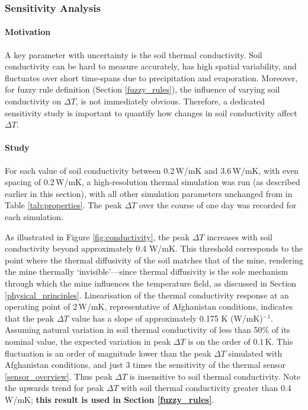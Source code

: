     \subsubsection{Sensitivity Analysis} \label{sec:cv_sensitivity}
    
        \paragraph{Motivation}
            
            \noindent A key parameter with uncertainty is the soil thermal conductivity. Soil conductivity can be hard to measure accurately, has high spatial variability, and fluctuates over short time-spans due to precipitation and evaporation. Moreover, for fuzzy rule definition (Section \ref{fuzzy_rules}), the influence of varying soil conductivity on \(\Delta T\), is not immediately obvious. Therefore, a dedicated sensitivity study is important to quantify how changes in soil conductivity affect \(\Delta T\).
        
        \paragraph{Study}
        
            \noindent For each value of soil conductivity between 0.2\,W/mK and 3.6\,W/mK, with even spacing of 0.2\,W/mK, a high-resolution thermal simulation was run (as described earlier in this section), with all other simulation parameters unchanged from in Table \ref{tab:properties}. The peak \(\Delta T\) over the course of one day was recorded for each simulation.
            
            As illustrated in Figure \ref{fig:conductivity}, the peak \(\Delta T\) increases with soil conductivity beyond approximately 0.4 W/mK. This threshold corresponds to the point where the thermal diffusivity of the soil matches that of the mine, rendering the mine thermally ‘invisible’—since thermal diffusivity is the sole mechanism through which the mine influences the temperature field, as discussed in Section \ref{physical_principles}. Linearisation of the thermal conductivity response at an operating point of 2\,W/mK, representative of Afghanistan conditions, indicates that the peak \(\Delta T\) value has a slope of approximately 0.175 K (W/mK)$^{-1}$. Assuming natural variation in soil thermal conductivity of less than 50\% of its nominal value, the expected variation in peak \(\Delta T\) is on the order of 0.1\,K. This fluctuation is an order of magnitude lower than the peak \(\Delta T\) simulated with Afghanistan conditions, and just 3 times the sensitivity of the thermal sensor \ref{sensor_overview}. Thus peak \(\Delta T\) is insensitive to soil thermal conductivity. Note the upwards trend for peak \(\Delta T\) with soil thermal conductivity greater than 0.4 W/mK; \textbf{this result is used in Section \ref{fuzzy_rules}}.

